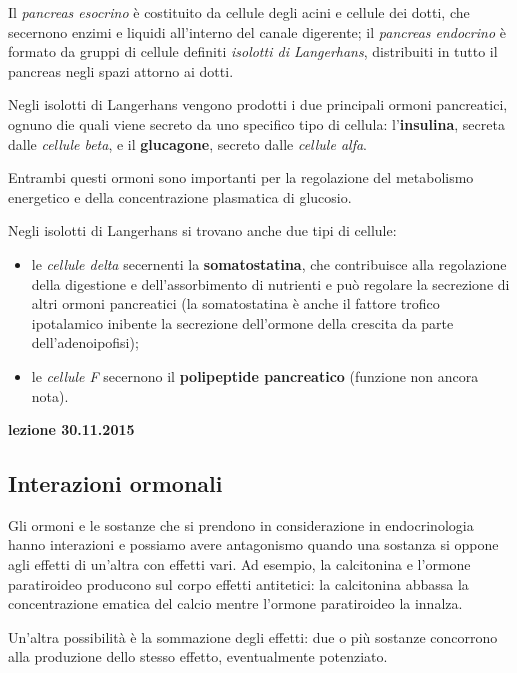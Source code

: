 \documentclass[]{article}
\begin{document}
Il \emph{pancreas esocrino} è costituito da cellule degli acini e
cellule dei dotti, che secernono enzimi e liquidi all'interno del canale
digerente; il \emph{pancreas endocrino} è formato da gruppi di cellule
definiti \emph{isolotti di Langerhans}, distribuiti in tutto il pancreas
negli spazi attorno ai dotti.

Negli isolotti di Langerhans vengono prodotti i due principali ormoni
pancreatici, ognuno die quali viene secreto da uno specifico tipo di
cellula: l'\textbf{insulina}, secreta dalle \emph{cellule beta}, e il
\textbf{glucagone}, secreto dalle \emph{cellule alfa}.

Entrambi questi ormoni sono importanti per la regolazione del
metabolismo energetico e della concentrazione plasmatica di glucosio.

Negli isolotti di Langerhans si trovano anche due tipi di cellule:

\begin{itemize}
\itemsep1pt\parskip0pt
\item
  le \emph{cellule delta} secernenti la \textbf{somatostatina}, che
  contribuisce alla regolazione della digestione e dell'assorbimento di
  nutrienti e può regolare la secrezione di altri ormoni pancreatici (la
  somatostatina è anche il fattore trofico ipotalamico inibente la
  secrezione dell'ormone della crescita da parte dell'adenoipofisi);
\item
  le \emph{cellule F} secernono il \textbf{polipeptide pancreatico}
  (funzione non ancora nota).
\end{itemize}

\textbf{lezione 30.11.2015}

\subsection{Interazioni ormonali}\label{interazioni-ormonali}

Gli ormoni e le sostanze che si prendono in considerazione in
endocrinologia hanno interazioni e possiamo avere antagonismo quando una
sostanza si oppone agli effetti di un'altra con effetti vari. Ad
esempio, la calcitonina e l'ormone paratiroideo producono sul corpo
effetti antitetici: la calcitonina abbassa la concentrazione ematica del
calcio mentre l'ormone paratiroideo la innalza.

Un'altra possibilità è la sommazione degli effetti: due o più sostanze
concorrono alla produzione dello stesso effetto, eventualmente
potenziato.
\end{document}
